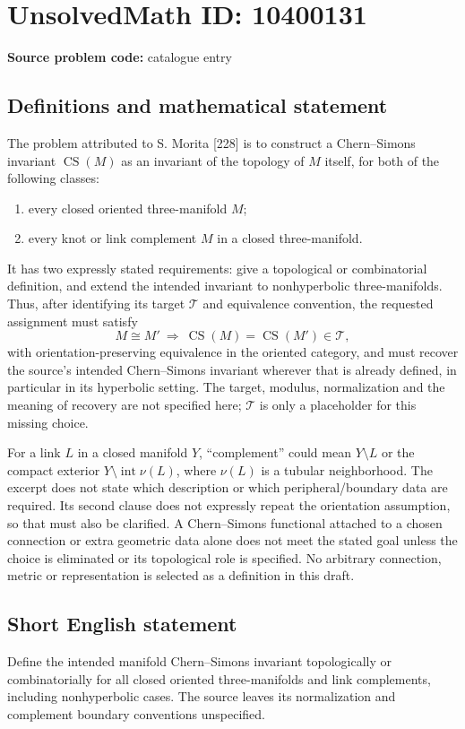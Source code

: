 \documentclass[11pt]{article}
\begin{document}
\section*{UnsolvedMath ID: 10400131}
\textbf{Source problem code:} catalogue entry
\subsection{Definitions and mathematical statement}
The problem attributed to S. Morita [228] is to construct a Chern--Simons invariant \(\operatorname{CS}(M)\) as an invariant of the topology of \(M\) itself, for both of the following classes:
\begin{enumerate}
\item every closed oriented three-manifold \(M\);
\item every knot or link complement \(M\) in a closed three-manifold.
\end{enumerate}
It has two expressly stated requirements: give a topological or combinatorial definition, and extend the intended invariant to nonhyperbolic three-manifolds. Thus, after identifying its target \(\mathcal T\) and equivalence convention, the requested assignment must satisfy
\[M\cong M'\ \Longrightarrow\ \operatorname{CS}(M)=\operatorname{CS}(M')\in\mathcal T,\]
with orientation-preserving equivalence in the oriented category, and must recover the source's intended Chern--Simons invariant wherever that is already defined, in particular in its hyperbolic setting. The target, modulus, normalization and the meaning of recovery are not specified here; \(\mathcal T\) is only a placeholder for this missing choice.

For a link \(L\) in a closed manifold \(Y\), ``complement'' could mean \(Y\setminus L\) or the compact exterior \(Y\setminus\operatorname{int}\nu(L)\), where \(\nu(L)\) is a tubular neighborhood. The excerpt does not state which description or which peripheral/boundary data are required. Its second clause does not expressly repeat the orientation assumption, so that must also be clarified. A Chern--Simons functional attached to a chosen connection or extra geometric data alone does not meet the stated goal unless the choice is eliminated or its topological role is specified. No arbitrary connection, metric or representation is selected as a definition in this draft.
\subsection{Short English statement}
Define the intended manifold Chern--Simons invariant topologically or combinatorially for all closed oriented three-manifolds and link complements, including nonhyperbolic cases. The source leaves its normalization and complement boundary conventions unspecified.
\end{document}
